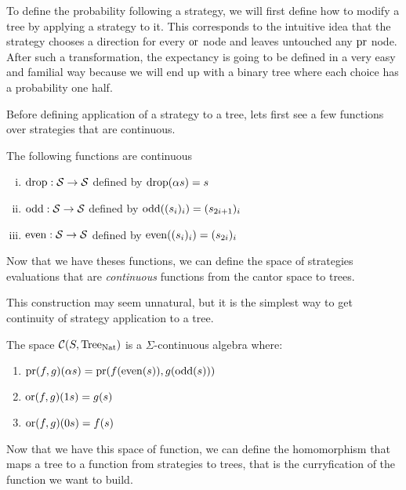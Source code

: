 \begin{ensps}
To define the probability following a strategy, we 
will first define how to modify a tree by applying a 
strategy to it. This corresponds to the intuitive 
idea that the strategy chooses a direction for every 
$\operatorname{or}$ node and leaves untouched any $\operatorname{pr}$ node.
After such a transformation, the expectancy is going 
to be defined in a very easy and familial way because 
we will end up with a binary tree where each choice
has a probability one half.

Before defining application of a strategy to a tree,
lets first see a few functions over strategies 
that are continuous.

\begin{alemma}
    The following functions are continuous 
    \begin{enumerate}[(i)]
        \item $\operatorname{drop} : \mathcal{S} \to \mathcal{S}$ defined by $\operatorname{drop}(\alpha s) = s$
        \item $\operatorname{odd} : \mathcal{S} \to \mathcal{S}$ defined by $\operatorname{odd}((s_i)_i) = (s_{2i + 1})_i$
        \item $\operatorname{even} : \mathcal{S} \to \mathcal{S}$ defined by $\operatorname{even}((s_i)_i) = (s_{2i})_i$
    \end{enumerate}
\end{alemma}

Now that we have theses functions, we can define the space 
of strategies evaluations that are \emph{continuous}
functions from the cantor space to trees. 

This construction may seem unnatural, but it is the simplest 
way to get continuity of strategy application to a tree.

\begin{adefinition}
    The space $\mathcal{C}(S,\textnormal{Tree}_{\textnormal{Nat}})$ is a $\Sigma$-continuous 
    algebra where:

    \begin{enumerate}
        \item $\operatorname{pr} (f,g) (\alpha s) = \operatorname{pr} (f (\operatorname{even}(s)), g(\operatorname{odd} (s)))$ 
        \item $\operatorname{or} (f,g) (1 s)      = g(s)$
        \item $\operatorname{or} (f,g) (0 s)      = f(s)$
    \end{enumerate}
\end{adefinition}

Now that we have this space of function, we can define the 
homomorphism that maps a tree to a function from strategies 
to trees, that is the curryfication of the function we want to build.


\end{ensps}
